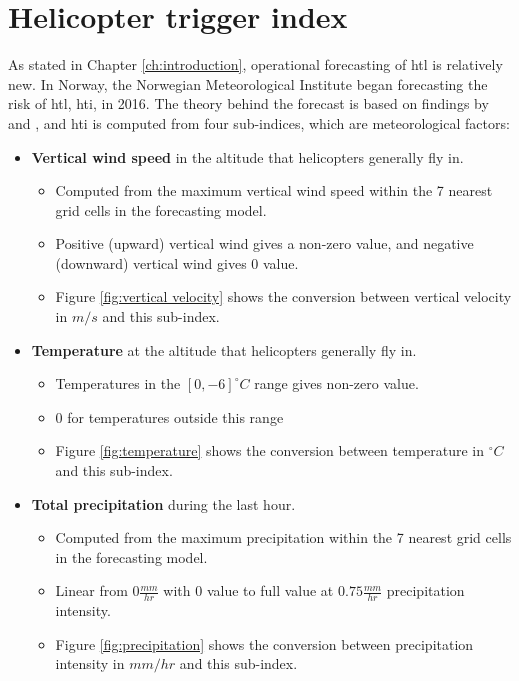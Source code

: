 \section{Helicopter trigger index}\label{sec:hti}
As stated in Chapter \ref{ch:introduction}, operational forecasting of \acrshort{htl} is relatively new. In Norway, the Norwegian Meteorological Institute began forecasting the risk of \acrshort{htl}, \acrfull{hti}, in 2016. The theory behind the forecast is based on findings by \cite{hardwick1999} and \cite{wilkinson2013}, and \acrshort{hti} is computed from four sub-indices, which are meteorological factors:
\begin{itemize}
    \item \textbf{Vertical wind speed} in the altitude that helicopters generally fly in.
    \begin{itemize}
        \item Computed from the maximum vertical wind speed within the 7 nearest grid cells in the forecasting model.
        \item Positive (upward) vertical wind gives a non-zero value, and negative (downward) vertical wind gives 0 value.
        \item Figure \ref{fig:vertical velocity} shows the conversion between vertical velocity in $m/s$ and this sub-index.
    \end{itemize}
    \item \textbf{Temperature} at the altitude that helicopters generally fly in.
    \begin{itemize}
        \item Temperatures in the $[0,-6] ^{\circ}C$ range gives non-zero value. 
        \item 0 for temperatures outside this range
        \item Figure \ref{fig:temperature} shows the conversion between temperature in $^{\circ}C$ and this sub-index.
    \end{itemize}
    \item \textbf{Total precipitation} during the last hour.
    \begin{itemize}
        \item Computed from the maximum precipitation within the 7 nearest grid cells in the forecasting model.
        \item Linear from $0\frac{mm}{hr}$ with 0 value to full value at $0.75\frac{mm}{hr}$ precipitation intensity.
        \item Figure \ref{fig:precipitation} shows the conversion between precipitation intensity in $mm/hr$ and this sub-index.

\end{itemize}
\end{itemize}
